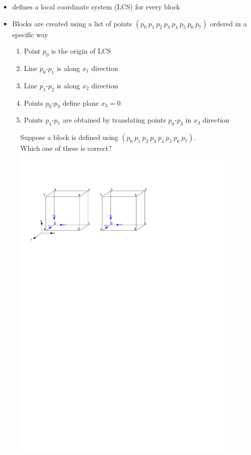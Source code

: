 \begin{frame}
    \begin{itemize}
        \setitemsep{1em}
        \item \openfoam{} defines a local coordinate system (LCS) for every block
        \item Blocks are created using a list of points $(p_0~p_1~p_2~p_3~p_4~p_5~p_6~p_7)$ ordered in a specific way
        \begin{enumerate}
            \item Point $p_0$ is the origin of LCS
            \item Line $p_0$-$p_1$ is along $x_1$ direction
            \item Line $p_1$-$p_2$ is along $x_2$ direction
            \item Points $p_0$-$p_3$ define plane $x_3=0$
            \item Points $p_4$-$p_7$ are obtained by translating points $p_0$-$p_3$ in $x_3$ direction
        \end{enumerate}
    \end{itemize}
    \begin{figure}
        \centering
        Suppose a block is defined using $(p_0~p_1~p_2~p_3~p_4~p_5~p_6~p_7)$.\\
        Which one of these is correct?\\[0.5em]
        \includegraphics[width=0.8\linewidth]{blockmesh_ordering}
    \end{figure}
\end{frame}

